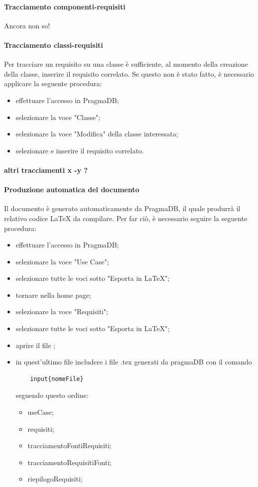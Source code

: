  \paragraph{Tracciamento componenti-requisiti}
 Ancora non so!
 \paragraph{Tracciamento classi-requisiti}
 Per tracciare un requisito su una classe è sufficiente, al momento della creazione della classe, inserire il requisito correlato. Se questo non è stato fatto, è necessario applicare la seguente procedura:
 \begin{itemize}
 	\item effettuare l'accesso in PragmaDB;
 	\item selezionare la voce "Classe";
 	\item selezionare la voce "Modifica" della classe interessata;
 	\item selezionare e inserire il requisito correlato.
 \end{itemize}
 \paragraph{altri tracciamenti x -y ?}
\paragraph{Produzione automatica del documento \ARdoc}
Il documento \ARdoc{} è generato automaticamente da PragmaDB, il quale produrrà il relativo codice \LaTeX{} da compilare.
Per far ciò, è necessario seguire la seguente procedura:
\begin{itemize}
	\item effettuare l'accesso in PragmaDB;
	\item selezionare la voce "Use Case";
	\item selezionare tutte le voci sotto "Esporta in \LaTeX";
	\item tornare nella home page;
	\item selezionare la voce "Requisiti";
	\item selezionare tutte le voci sotto "Esporta in \LaTeX";
	\item aprire il file \ARfile;
	\item in quest'ultimo file includere i file .tex generati da pragmaDB con il comando \begin{verbatim}
	input{nomeFile}
	\end{verbatim}
	seguendo questo ordine: 
	\begin{itemize}
		\item useCase;
		\item requisiti;
		\item tracciamentoFontiRequisiti;
		\item tracciamentoRequisitiFonti;
		\item riepilogoRequisiti;
	\end{itemize}
\end{itemize}

